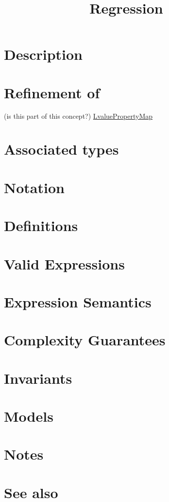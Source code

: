 \documentclass{article}
\begin{document}
\title{Regression}
\maketitle

\section*{Description}
\section*{Refinement of}

(is this part of this concept?)
\href{http://www.boost.org/libs/property_map/LvaluePropertyMap.html}{LvaluePropertyMap}

\section*{Associated types}
\section*{Notation}
\section*{Definitions}
\section*{Valid Expressions}
\section*{Expression Semantics}
\section*{Complexity Guarantees}
\section*{Invariants}
\section*{Models}
\section*{Notes}
\section*{See also}




\end{document}
